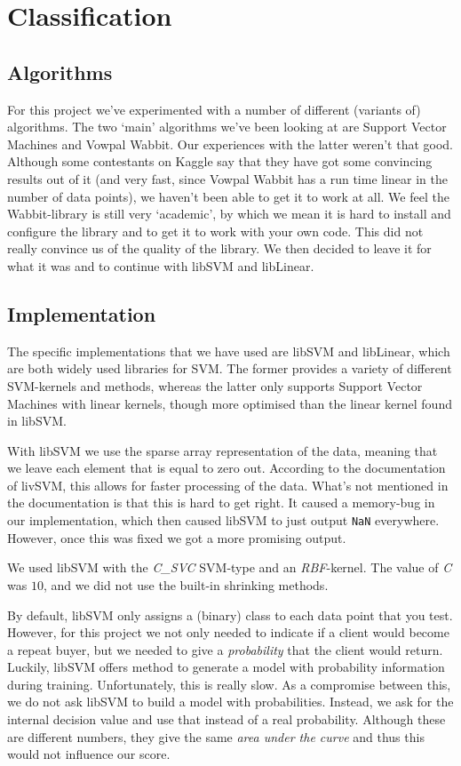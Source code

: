\documentclass[a4paper]{jmlr}
\begin{document}
\section{Classification}
\subsection{Algorithms}
For this project we've experimented with a number of different (variants of) algorithms. The two `main' algorithms we've been looking at are Support Vector Machines and Vowpal Wabbit. Our experiences with the latter weren't that good. Although some contestants on Kaggle say that they have got some convincing results out of it (and very fast, since Vowpal Wabbit has a run time linear in the number of data points), we haven't been able to get it to work at all. We feel the Wabbit-library is still very `academic', by which we mean it is hard to install and configure the library and to get it to work with your own code. This did not really convince us of the quality of the library. We then decided to leave it for what it was and to continue with libSVM and libLinear.
\subsection{Implementation}
The specific implementations that we have used are libSVM and libLinear, which are both widely used libraries for SVM. The former provides a variety of different SVM-kernels and methods, whereas the latter only supports Support Vector Machines with linear kernels, though more optimised than the linear kernel found in libSVM.

With libSVM we use the sparse array representation of the data, meaning that we leave each element that is equal to zero out. According to the documentation of livSVM, this allows for faster processing of the data. What's not mentioned in the documentation is that this is hard to get right. It caused a memory-bug in our implementation, which then caused libSVM to just output \texttt{NaN} everywhere. However, once this was fixed we got a more promising output.

We used libSVM with the \emph{C\_SVC} SVM-type and an \emph{RBF}-kernel. The value of \emph{C} was $10$, and we did not use the built-in shrinking methods.

By default, libSVM only assigns a (binary) class to each data point that you test. However, for this project we not only needed to indicate if a client would become a repeat buyer, but we needed to give a \emph{probability} that the client would return. Luckily, libSVM offers method to generate a model with probability information during training. Unfortunately, this is really slow. As a compromise between this, we do not ask libSVM to build a model with probabilities. Instead, we ask for the internal decision value and use that instead of a real probability. Although these are different numbers, they give the same \emph{area under the curve} and thus this would not influence our score.
\end{document}
